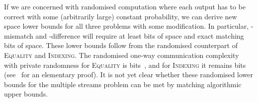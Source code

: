 \documentclass[envcountsame]{llncs}
\newcommand{\indexing}{\textsc{Indexing}\xspace}
\newcommand{\equality}{\textsc{Equality}\xspace}
\begin{document}
If we are concerned with
randomised computation where each output has to be correct with some
(arbitrarily large) constant probability, we can derive new space
lower bounds for all three problems with some modification. In particular, -mismatch and
-difference will require at least  bits of
space and exact matching   bits of space. These
lower bounds follow from the randomised counterpart of \equality and
\indexing. The randomised one-way communication complexity with private
randomness for \equality is  bits~\cite{Yao:79}, and
for \indexing it remains  bits (see~\cite{JKS:08} for an
elementary proof).  It is not yet clear whether these randomised lower bounds for
the multiple streams problem can be met by matching algorithmic upper bounds.





\end{document}
